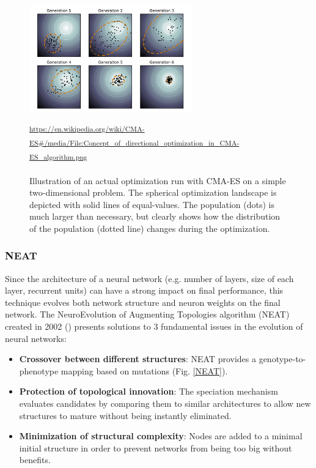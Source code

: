 \begin{figure}[H]
 \centering
 \captionsetup{justification=centering, margin=0.5cm}
 \includegraphics[width=7cm]{images/CMA_ES.png}
 \caption{\label{CMA-ES}Illustration of an actual optimization run with CMA-ES on a simple two-dimensional problem. The spherical optimization landscape is depicted with solid lines of equal-values. The population (dots) is much larger than necessary, but clearly shows how the distribution of the population (dotted line) changes during the optimization.}
\small\textsuperscript{\url{https://en.wikipedia.org/wiki/CMA-ES#/media/File:Concept_of_directional_optimization_in_CMA-ES_algorithm.png}}
 \label{CMA-ES}
\end{figure}

\bigbreak

\subsubsection{NEAT}
Since the architecture of a neural network (e.g. number of layers, size of each layer, recurrent units) can have a strong impact on final performance, this technique evolves both network structure and neuron weights on the final network. The NeuroEvolution of Augmenting Topologies algorithm (NEAT) created in 2002 (\cite{NEAT_1, NEAT_2}) presents solutions to 3 fundamental issues in the evolution of neural networks:

\begin{itemize}
    \item \textbf{Crossover between different structures}: NEAT provides a genotype-to-phenotype mapping based on mutations (Fig. \ref{NEAT}).
    \item \textbf{Protection of topological innovation}: The speciation mechanism evaluates candidates by comparing them to similar architectures to allow new structures to mature without being instantly eliminated. 
    \item \textbf{Minimization of structural complexity}: Nodes are added to a minimal initial structure in order to prevent networks from being too big without benefits.
\end{itemize}
\bigbreak

